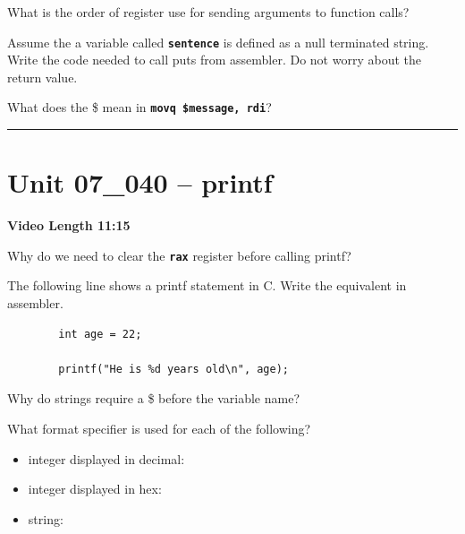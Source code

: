 \documentclass[letterpaper,12pt]{exam}
\newcommand{\unit}{Unit 07}
\begin{document}
\begin{questions}
\begin{samepage}
    \question What is the order of register use for sending arguments to function calls?
    \vspace{5mm}
\end{samepage}
\par
\begin{samepage}
    \question Assume the a variable called \texttt{\textbf{sentence}} is defined as a null terminated string.  Write the code needed to call puts from assembler.  Do not worry about the return value.
    \vspace{35mm}
\end{samepage}
\par
 \begin{samepage}
     \question What does the \$ mean in \texttt{\textbf{movq \$message, rdi}}?
     \vspace{5mm}
 \end{samepage}
 \par
  

\rule{0.5\textwidth}{.4pt} %
\section*{\unit\_040 -- printf}
\par{\selectfont\textbf{Video Length 11:15}}
\begin{samepage}
    \question Why do we need to clear the \texttt{\textbf{rax}} register before calling printf?
    \vspace{5mm}
\end{samepage}
\par
\begin{samepage}
    \question The following line shows a printf statement in C.  Write the equivalent in assembler.
    \begin{verbatim}
        int age = 22;

        printf("He is %d years old\n", age);
    \end{verbatim}
    \vspace{45mm}
\end{samepage}
\par
 \begin{samepage}
     \question Why do strings require a \$ before the variable name?
     \vspace{5mm}
 \end{samepage}
 \par
 \begin{samepage}
     \question What format specifier is used for each of the following?
      \begin{itemize}
        \item integer displayed in decimal:
        \item integer displayed in hex: 
        \item string:
      \end{itemize}
     \vspace{5mm}
 \end{samepage}
 \par
  

\end{questions}
\end{document}

